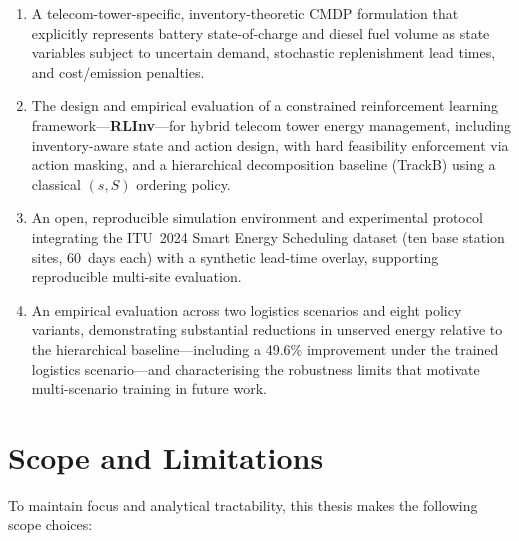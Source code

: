 \begin{enumerate}
  \item A telecom-tower-specific, inventory-theoretic CMDP formulation that
  explicitly represents battery state-of-charge and diesel fuel volume as
  state variables subject to uncertain demand, stochastic replenishment lead
  times, and cost/emission penalties.

  \item The design and empirical evaluation of a constrained reinforcement
  learning framework---\textbf{RLInv}---for hybrid telecom tower energy
  management, including inventory-aware state and action design, with hard
  feasibility enforcement via action masking, and a hierarchical decomposition
  baseline (TrackB) using a classical $(s,S)$ ordering policy.

  \item An open, reproducible simulation environment and experimental protocol
  integrating the ITU~2024 Smart Energy Scheduling dataset (ten base station
  sites, 60~days each) with a synthetic lead-time overlay, supporting
  reproducible multi-site evaluation.

  \item An empirical evaluation across two logistics scenarios and eight policy
  variants, demonstrating substantial reductions in unserved energy relative to
  the hierarchical baseline---including a 49.6\% improvement under the trained
  logistics scenario---and characterising the robustness limits that motivate
  multi-scenario training in future work.
\end{enumerate}


\section{Scope and Limitations}

To maintain focus and analytical tractability, this thesis makes the following
scope choices:

